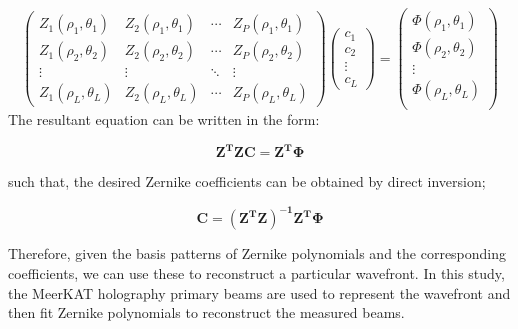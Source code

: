 \begin{equation}
{
 \begin{pmatrix}
   Z_{1}(\rho_{1},\theta_{1}) & Z_{2}(\rho_{1},\theta_{1}) & \cdots & Z_{P}(\rho_{1},\theta_{1})\\
   Z_{1}(\rho_{2},\theta_{2}) & Z_{2}(\rho_{2},\theta_{2}) & \cdots & Z_{P}(\rho_{2},\theta_{2})\\
    \vdots                    &     \vdots                 & \ddots &    \vdots  \\     
   Z_{1}(\rho_{L},\theta_{L}) & Z_{2}(\rho_{L},\theta_{L}) & \cdots & Z_{P}(\rho_{L},\theta_{L})
   \end{pmatrix}  \begin{pmatrix} c_{1}\\
				  c_{2}\\
				  \vdots\\
				  c_{L}
    
   \end{pmatrix} = 
   \begin{pmatrix}
    \Phi(\rho_{1},\theta_{1})\\
    \Phi(\rho_{2},\theta_{2})\\
    \vdots\\
    \Phi(\rho_{L},\theta_{L})\\
    
   \end{pmatrix}
  } \label{eq:lsq1}
  \end{equation}
The resultant equation can be written in the form:

\begin{equation} \label{eq:invmthd}
 \bm{Z^{T}ZC} =  \bm{Z^{T}\Phi}
\end{equation}

\noindent such that, the desired Zernike coefficients can be obtained by direct inversion;

\begin{equation} \label{eq:invmthd2}
 \bm{C} =  \bm{(Z^{T}Z)^{-1}Z^{T}\Phi}
\end{equation}

\noindent Therefore, given the basis patterns of Zernike polynomials and the corresponding coefficients, we can use these to reconstruct a particular wavefront.
In this study, the MeerKAT holography primary beams are used to represent the wavefront and then fit Zernike polynomials to reconstruct the measured beams.


